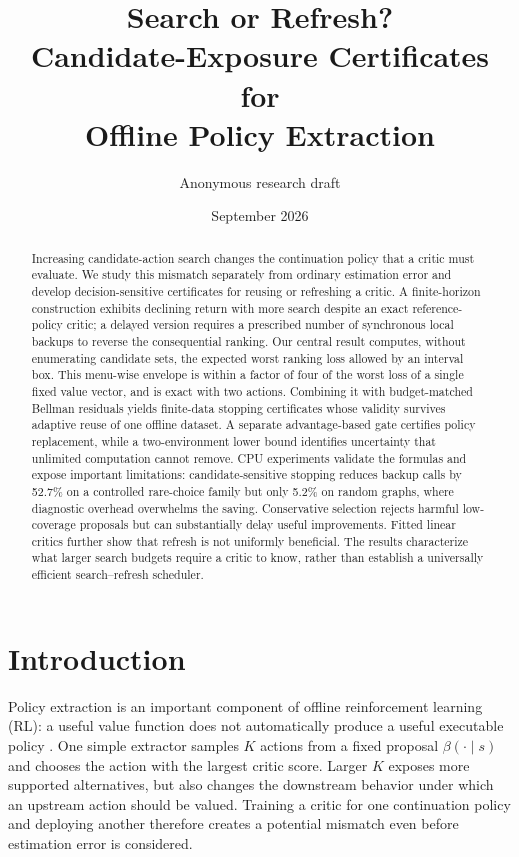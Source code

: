\documentclass[11pt]{article}
\title{\vspace{-1.2em}\textbf{Search or Refresh?}\\Candidate-Exposure Certificates for\\Offline Policy Extraction}
\author{Anonymous research draft}
\date{September 2026}
\begin{document}
\maketitle
\begin{abstract}
Increasing candidate-action search changes the continuation policy that a critic must evaluate. We study this mismatch separately from ordinary estimation error and develop decision-sensitive certificates for reusing or refreshing a critic. A finite-horizon construction exhibits declining return with more search despite an exact reference-policy critic; a delayed version requires a prescribed number of synchronous local backups to reverse the consequential ranking. Our central result computes, without enumerating candidate sets, the expected worst ranking loss allowed by an interval box. This menu-wise envelope is within a factor of four of the worst loss of a single fixed value vector, and is exact with two actions. Combining it with budget-matched Bellman residuals yields finite-data stopping certificates whose validity survives adaptive reuse of one offline dataset. A separate advantage-based gate certifies policy replacement, while a two-environment lower bound identifies uncertainty that unlimited computation cannot remove. CPU experiments validate the formulas and expose important limitations: candidate-sensitive stopping reduces backup calls by 52.7\% on a controlled rare-choice family but only 5.2\% on random graphs, where diagnostic overhead overwhelms the saving. Conservative selection rejects harmful low-coverage proposals but can substantially delay useful improvements. Fitted linear critics further show that refresh is not uniformly beneficial. The results characterize what larger search budgets require a critic to know, rather than establish a universally efficient search--refresh scheduler.
\end{abstract}

\section{Introduction}
Policy extraction is an important component of offline reinforcement learning (RL): a useful value function does not automatically produce a useful executable policy \citep{park2024bottleneck}. One simple extractor samples $K$ actions from a fixed proposal $\beta(\cdot\mid s)$ and chooses the action with the largest critic score. Larger $K$ exposes more supported alternatives, but also changes the downstream behavior under which an upstream action should be valued. Training a critic for one continuation policy and deploying another therefore creates a potential mismatch even before estimation error is considered.
\end{document}
